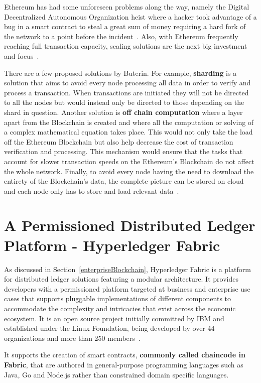 Ethereum has had some unforeseen problems along the way, namely the Digital
Decentralized Autonomous Organization heist where a hacker took advantage of a
bug in a smart contract to steal a great sum of money requiring a hard fork of
the network to a point before the incident~\cite{Leising2017}. Also, with
Ethereum frequently reaching full transaction capacity, scaling solutions are
the next big investment and focus~\cite{ethereumScalability2018}.

There are a few proposed solutions by Buterin. For example, \textbf{sharding}
is a solution that aims to avoid every node processing all data in order to
verify and process a transaction. When transactions are initiated they will not
be directed to all the nodes but would instead only be directed to those
depending on the shard in question.  Another solution is \textbf{off chain
computation} where a layer apart from the Blockchain is created and where all
the computation or solving of a complex mathematical equation takes place. This
would not only take the load off the Ethereum Blockchain but also help decrease
the cost of transaction verification and processing. This mechanism would
ensure that the tasks that account for slower transaction speeds on the
Ethereum’s Blockchain do not affect the whole network. Finally, to avoid every
node having the need to download the entirety of the Blockchain's data, the
complete picture can be stored on cloud and each node only has to store and
load relevant data~\cite{ethereumBlogScalability2018}.

\section{A Permissioned Distributed Ledger Platform - Hyperledger Fabric}
\label{distributedLedgerPlatform}

As discussed in Section~\ref{enterpriseBlockchain}, Hyperledger Fabric is a
platform for distributed ledger solutions featuring a modular architecture. It
provides developers with a permissioned platform targeted at business and
enterprise use cases that supports pluggable implementations of different
components to accommodate the complexity and intricacies that exist across the
economic ecosystem. It is an open source project initially committed by IBM  and
established under the Linux Foundation, being developed by over 44
organizations and more than 250
members~\cite{HyperledgerFabricDocs2017,HyperledgerGrowth2018}.

It supports the creation of smart contracts, \textbf{commonly called chaincode
in Fabric}, that are authored in general-purpose programming languages such as
Java, Go and Node.js rather than constrained domain specific languages. 

